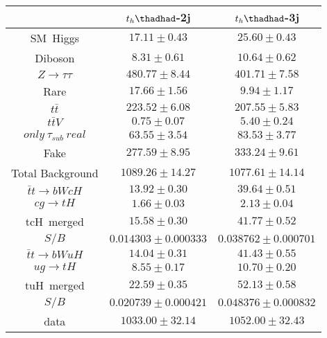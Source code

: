 \centering
\begin{tabular}{ccc}\toprule\toprule
 & $t_{h}\thadhad$-2j                      & $t_{h}\thadhad$-3j \\\midrule
SM~Higgs               &$17.11\pm0.43$               & $25.60\pm0.43$     \\
Diboson                &$8.31\pm0.61$                & $10.64\pm0.62$     \\
$Z\to\tau\tau$         &$480.77\pm8.44$              & $401.71\pm7.58$   \\
Rare                   &$17.66\pm1.56$               & $9.94\pm1.17$     \\
$t\bar{t}$             &$223.52\pm6.08$              & $207.55\pm5.83$    \\
$t\bar{t}V$            &$0.75\pm0.07$                & $5.40\pm0.24$      \\
$only~\tau_{sub}~real$ &$63.55\pm3.54$               & $83.53\pm3.77$     \\
Fake                   &$277.59\pm8.95$              & $333.24\pm9.61$    \\\midrule
Total Background       &$1089.26\pm14.27$            & $1077.61\pm14.14$  \\\midrule\midrule
$\bar{t}t\to bWcH$     &$13.92\pm0.30$               & $39.64\pm0.51$\\
$cg\to tH$             &$1.66\pm0.03$                & $2.13 \pm0.04$\\
tcH~merged             &$15.58\pm0.30$               & $41.77\pm0.52$\\
$S/B$ &$0.014303\pm0.000333$ &$0.038762\pm0.000701$\\\midrule
$\bar{t}t\to bWuH$     &$14.04\pm0.31$               & $41.43\pm0.55$\\
$ug\to tH$             &$8.55\pm0.17$                & $10.70\pm0.20$\\ 
tuH~merged             &$22.59\pm0.35$               & $52.13\pm0.58$\\   
 $S/B$& $0.020739\pm0.000421$ &$0.048376\pm0.000832$ \\\midrule\midrule
data                   &$1033.00\pm32.14$            & $1052.00\pm32.43$  \\
\bottomrule\bottomrule
\end{tabular}
